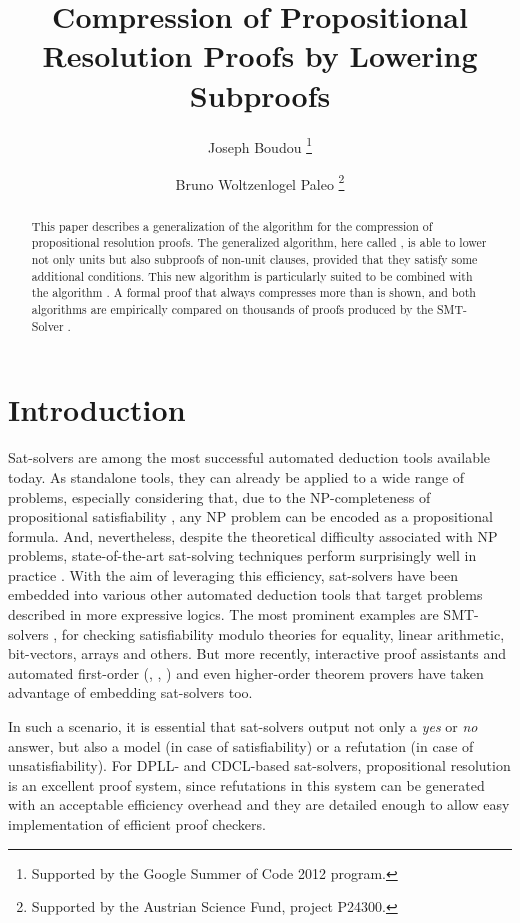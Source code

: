 \documentclass{llncs}
\title{Compression of Propositional Resolution Proofs by Lowering Subproofs}
\author{
  Joseph Boudou\inst{1}
  \thanks{Supported by the Google Summer of Code 2012 program.}
  \and 
  Bruno Woltzenlogel Paleo\inst{2}
  \thanks{Supported by the Austrian Science Fund, project P24300.}
}
\institute{
  Universit\'e Paul Sabatier, Toulouse \\
  \email{joseph.boudou@matabio.net}
  \and 
  Vienna University of Technology \\
  \email{bruno@logic.at}
}
\begin{document}
\maketitle


\begin{abstract}
This paper describes a generalization of the {\LowerUnits} algorithm \cite{LURPI} for the
compression of propositional resolution proofs.  The generalized algorithm, here called
{\LowerUnivalents}, is able to lower not only units but also subproofs of non-unit clauses, provided
that they satisfy some additional conditions.  This new algorithm is particularly suited to be
combined with the {\RecyclePivotsIntersection} algorithm \cite{LURPI}.  A formal proof that
{\LowerUnivalents} always compresses more than {\LowerUnits} is shown, and both algorithms are
empirically compared on thousands of proofs produced by the SMT-Solver \veriT.
\end{abstract}

\setcounter{footnote}{0}

\section{Introduction}

Sat-solvers are among the most successful automated deduction tools available today. As standalone
tools, they can already be applied to a wide range of problems, especially considering that, due to
the NP-completeness of propositional satisfiability \cite{cook}, any NP problem can be encoded as a
propositional formula. And, nevertheless, despite the theoretical difficulty associated with NP
problems, state-of-the-art sat-solving techniques perform surprisingly well in practice
\cite{sat-competition}. With the aim of leveraging this efficiency, sat-solvers have been embedded
into various other automated deduction tools that target problems described in more expressive
logics. The most prominent examples are SMT-solvers \cite{veriT}, for checking satisfiability modulo
theories for equality, linear arithmetic, bit-vectors, arrays and others. But more recently,
interactive proof assistants \cite{isabelle-blanchette-boehme} and automated first-order
(\cite{spassT}, \cite{iProver}, \cite{Vampire}) and even higher-order \cite{satallax} theorem provers have
taken advantage of embedding sat-solvers too.

In such a scenario, it is essential that sat-solvers output not only a \emph{yes} or \emph{no}
answer, but also a model (in case of satisfiability) or a refutation (in case of unsatisfiability).
For DPLL- and CDCL-based sat-solvers, propositional resolution is an excellent proof system, since
refutations in this system can be generated with an acceptable efficiency overhead and they are
detailed enough to allow easy implementation of efficient proof checkers.
\end{document}
